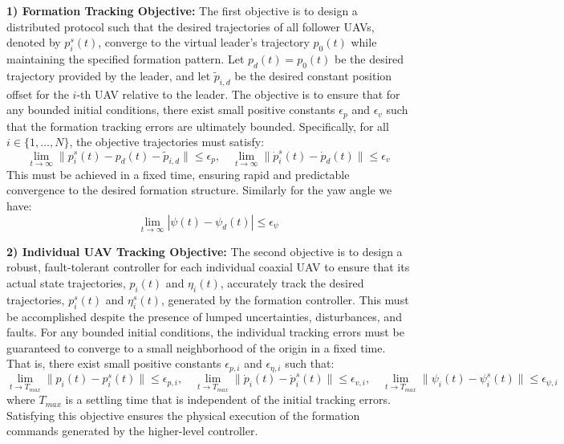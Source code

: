 \textbf{1) Formation Tracking Objective:}
The first objective is to design a distributed protocol such that the desired trajectories of all follower UAVs, denoted by $p_i^s(t)$, converge to the virtual leader's trajectory $p_0(t)$ while maintaining the specified formation pattern. Let $p_d(t) = p_0(t)$ be the desired trajectory provided by the leader, and let $\tilde{p}_{i,d}$ be the desired constant position offset for the $i$-th UAV relative to the leader. The objective is to ensure that for any bounded initial conditions, there exist small positive constants $\epsilon_p$ and $\epsilon_v$ such that the formation tracking errors are ultimately bounded. Specifically, for all $i \in \{1, \dots, N\}$, the objective trajectories must satisfy:
\begin{equation}
    \lim_{t \to \infty} \| p_i^s(t) - p_d(t) - \tilde{p}_{i,d} \| \le \epsilon_p, \quad \lim_{t \to \infty} \| \dot{p}_i^s(t) - \dot{p}_d(t) \| \le \epsilon_v
    \label{eq:formation_objective}
\end{equation}
This must be achieved in a fixed time, ensuring rapid and predictable convergence to the desired formation structure. Similarly for the yaw angle we have:
\begin{equation}
\lim_{t \to \infty} | \psi(t) - \psi_d(t) | \le \epsilon_{\psi}
    \label{eq:formation_objectiveyaw}
\end{equation}

\textbf{2) Individual UAV Tracking Objective:}
The second objective is to design a robust, fault-tolerant controller for each individual coaxial UAV to ensure that its actual state trajectories, $p_i(t)$ and $\eta_i(t)$, accurately track the desired trajectories, $p_i^s(t)$ and $\eta_i^s(t)$, generated by the formation controller. This must be accomplished despite the presence of lumped uncertainties, disturbances, and faults. For any bounded initial conditions, the individual tracking errors must be guaranteed to converge to a small neighborhood of the origin in a fixed time. That is, there exist small positive constants $\epsilon_{p,i}$ and $\epsilon_{\eta,i}$ such that:
\begin{equation}
    \lim_{t \to T_{max}} \| p_i(t) - p_i^s(t) \| \le \epsilon_{p,i}, \quad \lim_{t \to T_{max}} \| \dot{p}_i(t) - \dot{p}_i^s(t) \| \le \epsilon_{v,i}, \quad    \lim_{t \to T_{max}} \| \psi_i(t) - \psi_i^s(t) \| \le \epsilon_{\psi,i}
\end{equation}
where $T_{max}$ is a settling time that is independent of the initial tracking errors. Satisfying this objective ensures the physical execution of the formation commands generated by the higher-level controller.

